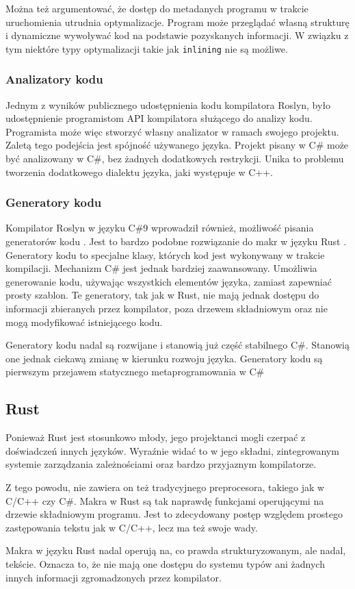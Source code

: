 Można też argumentować, że dostęp do metadanych programu w trakcie uruchomienia utrudnia optymalizacje.
Program może przeglądać własną strukturę i dynamiczne wywoływać kod na podstawie pozyskanych informacji.
W związku z tym niektóre typy optymalizacji takie jak \lstinline{inlining} nie są możliwe.

\subsubsection{Analizatory kodu}

Jednym z wyników publicznego udostępnienia kodu kompilatora Roslyn\cite{roslyn}, było udostępnienie programistom API kompilatora służącego do analizy kodu.
Programista może więc stworzyć własny analizator w ramach swojego projektu.
Zaletą tego podejścia  jest spójność używanego języka.
Projekt pisany w C\# może być analizowany w C\#, bez żadnych dodatkowych restrykcji.
Unika to problemu tworzenia dodatkowego dialektu języka, jaki występuje w C++.

\subsubsection{Generatory kodu}

Kompilator Roslyn w języku C\#9 wprowadził również, możliwość pisania generatorów kodu \cite{csharp:source_generators,roslyn}.
Jest to bardzo podobne rozwiązanie do makr w języku Rust \cite{rust}. Generatory kodu to specjalne klasy, których kod jest wykonywany w trakcie kompilacji. 
Mechanizm C\# jest jednak bardziej zaawansowany.
Umożliwia generowanie kodu, używając wszystkich elementów języka, zamiast zapewniać prosty szablon.
Te generatory, tak jak w Rust, nie mają jednak dostępu do informacji zbieranych przez kompilator, poza drzewem składniowym oraz nie mogą modyfikować istniejącego kodu.

Generatory kodu nadal są rozwijane i stanowią już część stabilnego C\#.
Stanowią one jednak ciekawą zmianę w kierunku rozwoju języka. 
Generatory kodu są pierwszym przejawem statycznego metaprogramowania w C\#

\subsection {Rust}
Ponieważ Rust \cite{rust} jest stosunkowo młody, jego projektanci mogli czerpać z doświadczeń innych języków. Wyraźnie widać to w jego składni, zintegrowanym systemie zarządzania zależnościami oraz bardzo przyjaznym kompilatorze.\par
Z tego powodu, nie zawiera on też tradycyjnego preprocesora, takiego jak w C/C++ czy C\#. Makra w Rust są tak naprawdę funkcjami operującymi na drzewie składniowym programu. Jest to zdecydowany postęp względem prostego zastępowania tekstu jak w C/C++, lecz ma też swoje wady.\par
Makra w języku Rust nadal operują na, co prawda strukturyzowanym, ale nadal, tekście. Oznacza to, że nie mają one dostępu do systemu typów ani żadnych innych informacji zgromadzonych przez kompilator.\par
